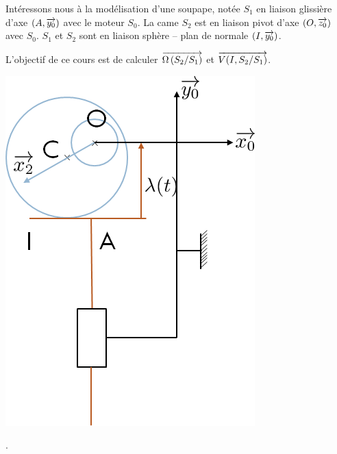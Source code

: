 \documentclass[10pt,oneside]{article}
\begin{document}
\begin{minipage}[c]{.65\linewidth}
Intéressons nous à la modélisation d'une soupape, notée $S_1$ en liaison glissière d'axe $(A,\overrightarrow{y_0})$ avec le moteur $S_0$. La came $S_2$ est en liaison pivot d'axe $(O,\overrightarrow{z_0})$ avec $S_0$.  $S_1$ et $S_2$ sont en liaison sphère -- plan de normale $(I,\overrightarrow{y_0})$.

L'objectif de ce cours est de calculer $\overrightarrow{\Omega\left( {S_2}/{S_1}\right)}$ et $\overrightarrow{V(I,S_2/S_1)}$.
\end{minipage}
\begin{minipage}[c]{.3\linewidth}
\begin{center}
\includegraphics[width=.8\textwidth]{png/fig2} 
\end{center}
\end{minipage}
.
\end{document}
